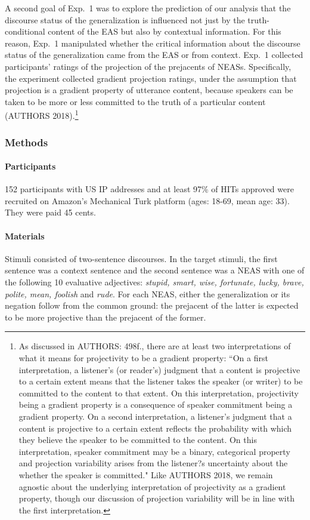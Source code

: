 \documentclass[11pt,fleqn]{article}
\newcommand{\6}{\mbox{$[\hspace*{-.6mm}[$}}
\newcommand{\9}{\mbox{$]\hspace*{-.6mm}]$}}
\begin{document}
A second goal of Exp.~1 was to explore the prediction of our analysis that the discourse status of the generalization is influenced not just by the truth-conditional content of the EAS but also by contextual information. For this reason, Exp.~1 manipulated whether the critical information about the discourse status of the generalization came from the EAS or from context. Exp.~1 collected participants' ratings of the projection of the prejacents of NEASs. Specifically, the experiment collected gradient projection ratings, under the assumption that projection is a gradient property of utterance content, because speakers can be taken to be more or less committed to the truth of a particular content (AUTHORS 2018).\footnote{As discussed in AUTHORS: 498f., there are at least two interpretations of what it means for projectivity to be a gradient property: ``On a first interpretation, a listener's (or reader's) judgment that a content is projective to a certain extent means that the listener takes the speaker (or writer) to be committed to the content to that extent. On this interpretation, projectivity being a gradient property is a consequence of speaker commitment being a gradient property. On a second interpretation, a listener's judgment that a content is projective to a certain extent reflects the probability with which they believe the speaker to be committed to the content. On this interpretation, speaker commitment may be a binary, categorical property and projection variability arises from the listener?s uncertainty about the whether the speaker is committed." Like AUTHORS 2018, we remain agnostic about the underlying interpretation of projectivity as a gradient property, though our discussion of projection variability will be in line with the first interpretation.}

\subsubsection{Methods}

\paragraph{Participants} 152 participants with US IP addresses and at least 97\% of HITs approved were recruited on Amazon's Mechanical Turk platform (ages: 18-69, mean age: 33). They were paid 45 cents.

\paragraph{Materials} Stimuli consisted of two-sentence discourses. In the target stimuli, the first sentence was a context sentence and the second sentence was a NEAS with one of the following 10 evaluative adjectives: {\em stupid, smart, wise, fortunate, lucky, brave, polite, mean, foolish} and {\em rude}. For each NEAS, either the generalization or its negation follow from the common ground: the prejacent of the latter is expected to be more projective than the prejacent of the former.
\end{document}

